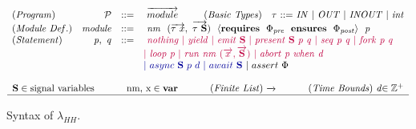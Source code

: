\documentclass[acmsmall,review,anonymous]{acmart}\settopmatter{printfolios=true,printccs=false,printacmref=false}
\newcommand{\effect}{\textcolor{black}{\ensuremath{\mathrm{\Phi}}}}
\newcommand{\code}[1]{{\tt{\ensuremath{\m{#1}}}}}
\newcommand{\m}{\mathit}
\begin{document}
{{ 

\begin{figure}[h]
  \vspace{0mm}
\renewcommand{\arraystretch}{1.1}
\centering
  $
  \begin{array}{lrcl}
 \m{(Program)} &  \code{\mathcal{P} }&\code{  ::= }& \
    \code{%
   \overrightarrow{module}} 
\qquad  \ \ 
    \m{(Basic\ Types)} \quad  \code{\tau\ } \code{  ::= } \
     \code{IN\ |\ OUT\ |\ INOUT \ | \ int }
    \\
  
      \m{(Module\ Def.)} &  \code{module}&\code{  ::= }&
  \code{ \ nm  \ \ {(\overrightarrow{\tau\ x}, \  \overrightarrow{\tau\ \textbf{S}} )}\ \ \langle\textbf{requires}\ \ \effect_{pre}\ \ \textbf{ensures}\ \  \effect_{post} \rangle\ \  {p} }
  \\

  \m{(Statement)} &  \code{{{p, \ q}}}&\code{  ::= }&
 \textcolor{purple} {  \code{ 
    \ nothing
         \ |\ yield
      \ |\ emit \ \textbf{S}
     \ |\ present \ \textbf{S} \ {p} \ {q}
     \ |\ seq\  {p} \ {q}  
          \  |\ fork\  {p}  \ {q}    
   }}\\
&&&  
 \textcolor{purple} {\code{ 
        |\ loop \ {p} 
\ | \ run \ nm \ {( \overrightarrow{x}, \overrightarrow{ \textbf{S}})}
  \   |\ abort\ {p}\ when\ d  
   } }
   \\
%
%   
   &&&

  
     \textcolor{ blue} {|\ async\ \textbf{S} \ {p} \ d
 \ |\ await\ \textbf{S}
 } 
 \ |\ assert\ \effect


    
  \\~\\



    
 
    \multicolumn{4}{c}{
      \code{\textbf{S} \in \text{signal variables}}  
      \qquad\quad \ 
\code{\text{nm, x} \in \textbf{var}}
   \qquad\quad \ 
       \code{
          \m{(Finite\ List) \ \overrightarrow{}}}
 \qquad\quad \ 
\m{(Time\ Bounds)}\ \code{d} \code{\in \mathbb{Z^+}}    
    }\\
       
    \hline
  \end{array}  
  $
    \vspace{0mm}
 \caption{Syntax of \code{\lambda_{HH}}.} 
 \label{fig:Hiphop_Syntax}
  \vspace{0mm}
\end{figure}
}


}
\end{document}

